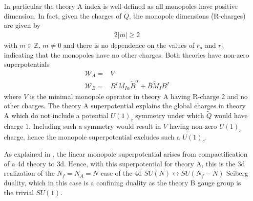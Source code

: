 \documentclass[12pt]{article}
\newcommand{\Zb}{\mathbb{Z}}
\newcommand{\Wcal}{\mathcal{W}}
\numberwithin{equation}{section}
\begin{document}
In particular the theory A index is well-defined as all monopoles have positive dimension. In fact, given the charges of $\tilde{Q}$, the monopole dimensions (R-charges) are given by
\begin{align}
\label{Mono_Ch_su2_2p1}
    2 |m| \ge 2
\end{align}
with $m \in \Zb$, $m \ne 0$ and there is no dependence on the values of $r_a$ and $r_b$ indicating that the monopoles have no other charges.
Both theories have non-zero superpotentials
\begin{align}
    \Wcal_A = & V \\
    \Wcal_B = & B^I M_{I \alpha} \widetilde{B}^{\alpha} + \overline{B} \widetilde{M}_I B^I
\end{align}
where $V$ is the minimal monopole operator in theory A having R-charge $2$ and no other charges. The theory A superpotential explains the global charges in theory A which do not include a potential $U(1)_c$ symmetry under which $\widetilde{Q}$ would have charge $1$. Including such a symmetry would result in $V$ having non-zero $U(1)_c$ charge, hence the monopole superpotential excludes such a $U(1)_c$.

As explained in \cite{Aharony:2013dha}, the linear monopole superpotential arises from compactification of a 4d theory to 3d. Hence, with this superpotential for theory A, this is the 3d realization of the $N_f = N_A = N$ case of the 4d $SU(N) \leftrightarrow SU(N_f - N)$ Seiberg duality, which in this case is a confining duality as the theory B gauge group is the trivial $SU(1)$.
\end{document}
